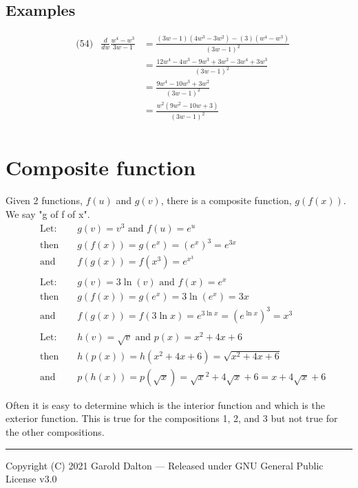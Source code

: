 \documentclass[14pt]{extarticle}
\begin{document}
\subsection*{Examples}
\begin{align*}
	&\text{(54)} &\frac{d}{dw} \frac{w^4 - w^3}{3w-1}&= \frac{(3w-1)(4w^3 - 3w^2) - (3)(w^4 - w^3)}{(3w-1)^2} \\
	&	&		&= \frac{12w^4- 4w^3 - 9w^3 + 3w^2 - 3w^4 + 3w^3}{(3w-1)^2} \\
	&	&		&=\frac{9w^4- 10w^3 + 3w^2 }{(3w-1)^2} \\
	&	&		&=\frac{w^2(9w^2- 10w + 3) }{(3w-1)^2} \\
\end{align*}


\section*{Composite function}
Given 2 functions, $f(u)$ and $g(v)$, there is a composite function, $g(f(x))$. We say "g of f of x".
\begin{align*}
	&\text{Let:} & &g(v) = v^3 \text{ and } f(u) = e^u \\
	&\text{then } & &g(f(x)) = g(e^x) = (e^x)^3 = e^{3x} \tag{1}\\
	&\text{and } & &f(g(x)) = f(x^3) = e^{x^3}	\tag{2}
\\\\
	&\text{Let:} & &g(v) = 3\ln(v) \text{ and } f(x) = e^x \\
	&\text{then } & &g(f(x)) = g(e^x) = 3\ln(e^x) = 3x \\
	&\text{and } & &f(g(x)) = f(3\ln x) = e^{3\ln x} = (e^{\ln x})^3 = x^3
\\\\
	&\text{Let:} & &h(v) = \sqrt{v} \text{ and } p(x) = x^2 + 4x + 6 \\
	&\text{then } & &h(p(x)) = h(x^2 + 4x + 6) = \sqrt{x^2 + 4x + 6} \tag{3}\\
	&\text{and } & &p(h(x)) = p(\sqrt{x}) = \sqrt{x}^2 +4\sqrt{x}+6 = x+4\sqrt{x}+6
\end{align*}

Often it is easy to determine which is the interior function and which is the exterior function. This is true for the compositions 1, 2, and 3 but not true for the other compositions.

\noindent\rule{\textwidth}{1pt}
{\footnotesize Copyright (C) 2021 Garold Dalton --- Released under GNU General Public License v3.0}


\cleardoublepage
\end{document}
